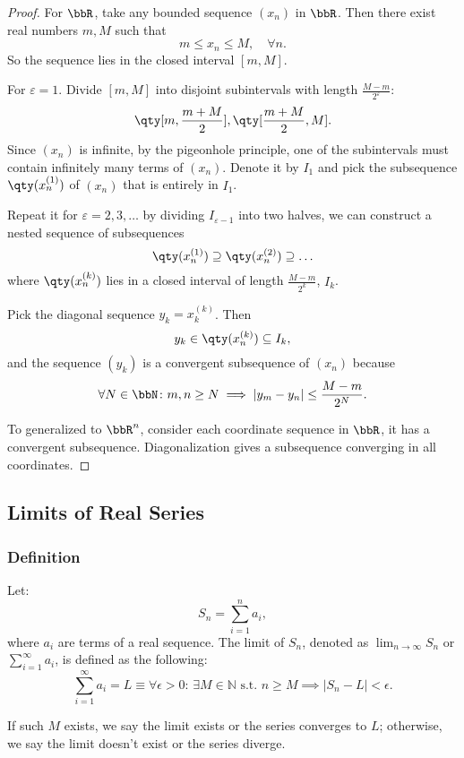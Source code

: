 \documentclass[a4paper,12pt]{report}
\begin{document}
\begin{proof}
    For $\bbR$, take any bounded sequence $(x_n)$ in $\bbR$. Then there exist real numbers $m,M$ such that
    \[m\leq x_n\leq M,\quad\forall n.\]
    So the sequence lies in the closed interval $[m,M]$.

    For $\varepsilon=1$. Divide $[m,M]$ into disjoint subintervals with length $\frac{M-m}{2^\varepsilon}$:
    \[\qty[m,\frac{m+M}{2}],\qty[\frac{m+M}{2},M].\]
    Since $(x_n)$ is infinite, by the pigeonhole principle, one of the subintervals must contain infinitely many terms of $(x_n)$. Denote it by $I_1$ and pick the subsequence $\qty(x_n^{(1)})$ of $(x_n)$ that is entirely in $I_1$.

    Repeat it for $\varepsilon=2,3,\ldots$ by dividing $I_{\varepsilon-1}$ into two halves, we can construct a nested sequence of subsequences
    \[\qty(x_n^{(1)})\supseteq \qty(x_n^{(2)})\supseteq\ldots\]
    where $\qty(x_n^{(k)})$ lies in a closed interval of length $\frac{M-m}{2^k}$, $I_k$.

    Pick the diagonal sequence $y_k=x_k^{(k)}$. Then
    \[y_k\in\qty(x_n^{(k)})\subseteq I_k,\]
    and the sequence $(y_k)$ is a convergent subsequence of $(x_n)$ because
    \[\forall N\in\bbN\colon m,n\geq N\implies |y_m-y_n|\leq\frac{M-m}{2^N}.\]

    To generalized to $\bbR^n$, consider each coordinate sequence in $\bbR$, it has a convergent subsequence. Diagonalization gives a subsequence converging in all coordinates.
\end{proof}
\subsection{Limits of Real Series}
\subsubsection{Definition}
Let:
\[S_n = \sum_{i=1}^n a_i,\]
where \(a_i\) are terms of a real sequence. The limit of \(S_n\), denoted as \(\lim_{n\to\infty}S_n\) or \(\sum_{i=1}^{\infty}a_i\), is defined as the following:
\[\sum_{i=1}^{\infty}a_i = L \equiv \forall \epsilon > 0:\, \exists M \in\mathbb{N}\text{\ s.t.\ } n \geq M\implies |S_n - L| < \epsilon.\]

If such $M$ exists, we say the limit exists or the series converges to $L$; otherwise, we say the limit doesn't exist or the series diverge.
\end{document}
